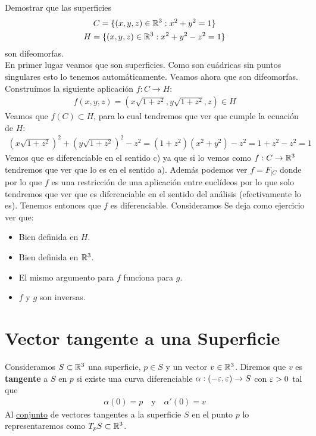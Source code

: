 \begin{ejercicio}
    Demostrar que las superficies 
    \begin{gather*}
        C = \{(x,y,z)\in \mathbb{R}^3 : x^2 + y^2 = 1\}\\
        H = \{(x,y,z)\in \mathbb{R}^3 : x^2 + y^2 -z^2 = 1\}
    \end{gather*}
    son difeomorfas.\\

    En primer lugar veamos que son superficies. Como son cuádricas sin puntos singulares esto lo tenemos automáticamente. Veamos ahora que son difeomorfas. Construímos la siguiente aplicación $f : C \to H$:
    \begin{gather*}
        f(x,y,z) = (x\sqrt{1+z^2}, y\sqrt{1+z^2}, z)\in H
    \end{gather*}
    Veamos que $f(C)\subset H$, para lo cual tendremos que ver que cumple la ecuación de $H$:
    \begin{gather*}
        (x\sqrt{1+z^2})^2 + (y\sqrt{1+z^2})^2 - z^2 = (1+z^2)(x^2 + y^2) - z^2 = 1+z^2 -z^2 = 1
    \end{gather*}
    Vemos que es diferenciable en el sentido c) ya que si lo vemos como $f:C\to \mathbb{R}^3$ tendremos que ver que lo es en el sentido a). Además podemos ver $f = F_{|C}$ donde 
    por lo que $f$ es una restricción de una aplicación entre euclídeos por lo que solo tendremos que ver que es diferenciable en el sentido del análisis (efectivamente lo es). Tenemos entonces que $f$ es diferenciable. Consideramos 
    Se deja como ejercicio ver que:
    \begin{itemize}
        \item Bien definida en $H$.
        \item Bien definida en $\mathbb{R}^3$.
        \item El mismo argumento para $f$ funciona para $g$.
        \item $f$ y $g$ son inversas.
    \end{itemize}
\end{ejercicio}

\section{Vector tangente a una Superficie}

\begin{definicion}
    Consideramos $S\subset \mathbb{R}^3$ una superficie, $p\in S$ y un vector $v\in \mathbb{R}^3$. Diremos que $v$ es \textbf{tangente} a $S$ en $p$ si existe una curva diferenciable $\alpha : (-\varepsilon, \varepsilon) \to S$ con $\varepsilon > 0$ tal que
    \begin{gather*}
        \alpha(0)=p\ \ \ \text{ y } \ \ \ \alpha'(0)=v
    \end{gather*}
    Al \underline{conjunto} de vectores tangentes a la superficie $S$ en el punto $p$ lo representaremos como $T_pS \subset \mathbb{R}^3$.
\end{definicion}

